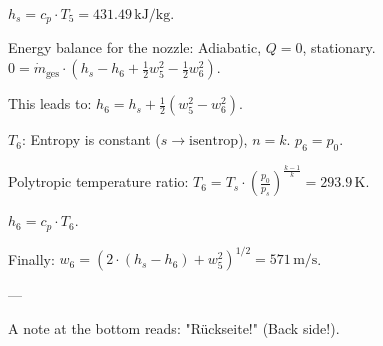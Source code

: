 \( h_s = c_p \cdot T_5 = 431.49 \, \text{kJ/kg} \).  

Energy balance for the nozzle:  
Adiabatic, \( Q = 0 \), stationary.  
\( 0 = \dot{m}_{\text{ges}} \cdot (h_s - h_6 + \frac{1}{2} w_5^2 - \frac{1}{2} w_6^2) \).  

This leads to:  
\( h_6 = h_s + \frac{1}{2} (w_5^2 - w_6^2) \).  

\( T_6 \):  
Entropy is constant (\( s \rightarrow \text{isentrop} \)), \( n = k \).  
\( p_6 = p_0 \).  

Polytropic temperature ratio:  
\( T_6 = T_s \cdot \left( \frac{p_0}{p_s} \right)^{\frac{k-1}{k}} = 293.9 \, \text{K} \).  

\( h_6 = c_p \cdot T_6 \).  

Finally:  
\( w_6 = \left( 2 \cdot (h_s - h_6) + w_5^2 \right)^{1/2} = 571 \, \text{m/s} \).  

---

A note at the bottom reads: "Rückseite!" (Back side!).